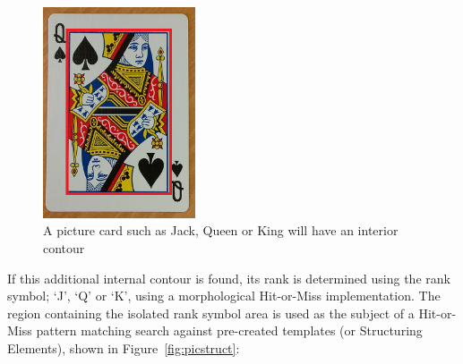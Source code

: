 \documentclass[a4paper,12pt,notitlepage]{article}
\begin{document}
			\begin{figure}[H]
				\centering
				\includegraphics[width=0.4\textwidth]{chris/image22}
				\caption{A picture card such as Jack, Queen or King will have an interior contour}
				\label{fig:innercont}
			\end{figure}

			If this additional internal contour is found, its rank is determined using the rank symbol; `J', `Q' or `K', using a morphological Hit-or-Miss implementation. The region containing the isolated rank symbol area is used as the subject of a Hit-or-Miss pattern matching search against pre-created templates (or Structuring Elements), shown in Figure~\ref{fig:picstruct}:
\end{document}
